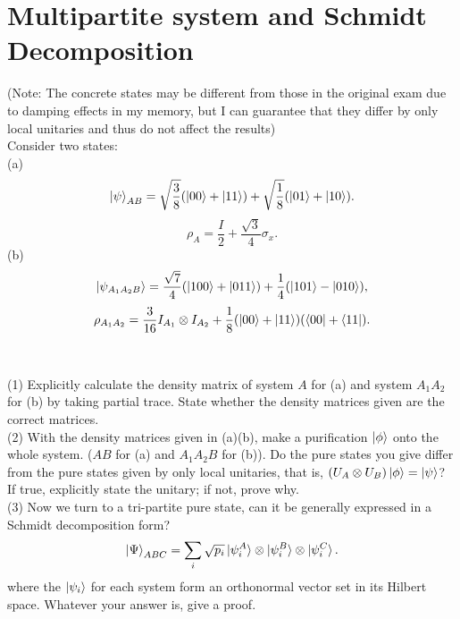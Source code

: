 \documentclass[12pt]{article}
\begin{document}
\section{Multipartite system and Schmidt Decomposition}
(Note: The concrete states may be different from those in the original exam due to damping effects in my memory, but I can guarantee that they differ by only local unitaries and thus do not affect the results)\\
Consider two states:\\
(a) \[\ket{\psi}_{AB}=\sqrt{\frac{3}{8}}(\ket{00}+\ket{11})+\sqrt\frac{1}{8}(\ket{01}+\ket{10}).\]
\[\rho_A=\frac{I}{2}+\frac{\sqrt3}{4}\sigma_x.\]
(b) \[\ket{\psi_{A_1A_2B}}=\frac{\sqrt7}{4}(\ket{100}+\ket{011})+\frac{1}{4}(\ket{101}-\ket{010}),\]
\[\rho_{A_1A_2}=\frac{3}{16}I_{A_1}\otimes I_{A_2}+\frac{1}{8}(\ket{00}+\ket{11})(\bra{00}+\bra{11}).\]
\\ \\
(1) Explicitly calculate the density matrix of system $A$ for (a) and system $A_1A_2$ for (b) by taking partial trace. State whether the density matrices given are the correct matrices.\\
(2) With the density matrices given in (a)(b), make a purification $\ket\phi$ onto the whole system. ($AB$ for (a) and $A_1A_2B$ for (b)). Do the pure states you give differ from the pure states given by only local unitaries, that is, $(U_A\otimes U_B)\ket\phi=\ket\psi$? If true, explicitly state the unitary; if not, prove why.\\
(3) Now we turn to a tri-partite pure state, can it be generally expressed in a Schmidt decomposition form?
\[\ket\Psi_{ABC}=\sum_{i}\sqrt{p_i}\ket{\psi_i^A}\otimes\ket{\psi_i^B}\otimes\ket{\psi_i^C}.\]
where the $\ket{\psi_i}$ for each system form an orthonormal vector set in its Hilbert space. Whatever your answer is, give a proof.
\end{document}
